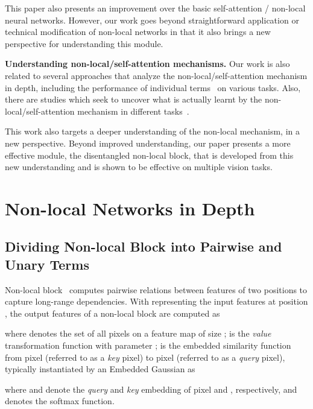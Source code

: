 \documentclass[runningheads]{llncs}
\begin{document}
This paper also presents an improvement over the basic self-attention / non-local neural networks. However, our work goes beyond straightforward application or technical modification of non-local networks in that it also brings a new perspective for understanding this module.

\noindent \textbf{Understanding non-local/self-attention mechanisms.} Our work is also related to several approaches that analyze the non-local/self-attention mechanism in depth, including the performance of individual terms~\cite{hu2017relation,tang2018analysis,zhu2019empirical} on various tasks. Also, there are studies which seek to uncover what is actually learnt by the non-local/self-attention mechanism in different tasks~\cite{cao2019gcnet}.

This work also targets a deeper understanding of the non-local mechanism, in a new perspective. Beyond improved understanding, our paper presents a more effective module, the disentangled non-local block, that is developed from this new understanding and is shown to be effective on multiple vision tasks.

\section{Non-local Networks in Depth}

\subsection{Dividing Non-local Block into Pairwise and Unary Terms}

Non-local block~\cite{wang2018non} computes pairwise relations between features of two positions to capture long-range dependencies. With  representing the input features at position , the output features  of a non-local block are computed as
\begin{footnotesize}

\end{footnotesize}where  denotes the set of all pixels on a feature map of size ;  is the \emph{value} transformation function with parameter ;  is the embedded similarity function from pixel  (referred to as a \emph{key} pixel) to pixel  (referred to as a \emph{query} pixel), typically instantiated by an Embedded Gaussian as
\begin{footnotesize}

\end{footnotesize}where  and  denote the \emph{query} and \emph{key} embedding of pixel  and , respectively, and  denotes the softmax function.
\end{document}
